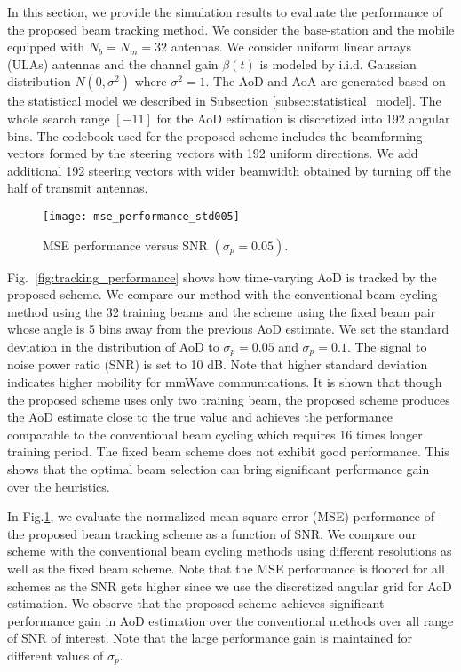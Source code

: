 \documentclass[conference]{IEEEtran}
\begin{document}
In this section, we provide the simulation results to evaluate the performance of the proposed beam tracking method. We consider the base-station and the mobile equipped with $N_{b}=N_{m}=32$ antennas. We consider uniform linear arrays (ULAs) antennas and the channel gain $\beta(t)$ is modeled by i.i.d. Gaussian distribution $N(0,\sigma^{2})$ where $\sigma^{2}=1$. The AoD and AoA are generated based on the statistical model we described in Subsection \ref{subsec:statistical_model}.
The whole search range $[-1 1]$  for the AoD estimation is discretized into 192 angular bins.
The codebook used for the proposed scheme includes the beamforming vectors formed by the steering vectors with 192 uniform directions. We add additional 192 steering vectors with wider beamwidth obtained by turning off the
half of transmit antennas.

\begin{figure} [t]
 \centering
 \texttt{[image: mse\_performance\_std005]}
 \\
 \caption{MSE performance versus SNR $(\sigma_{p}=0.05)$.} \label{fig:mse_performance}
\end{figure}
Fig.~\ref{fig:tracking_performance} shows how time-varying AoD is tracked by the proposed scheme.
We compare our method with the conventional beam cycling method using the 32  training beams
and the  scheme using the fixed beam pair whose angle is 5 bins away from the previous AoD estimate.
We set the standard deviation in the distribution of AoD to $\sigma_{p}=0.05$ and $\sigma_{p}=0.1$. The signal to noise power ratio (SNR) is set to 10 dB. Note that
higher standard deviation indicates higher mobility for mmWave communications.  It is shown that though the proposed scheme uses only two training beam, the proposed scheme produces the AoD estimate close to the true value and achieves the performance comparable to the conventional beam cycling which requires 16 times longer training period.
The fixed beam scheme does not exhibit good performance. This shows that the optimal beam selection can bring significant performance gain over the heuristics.

In Fig.\ref{fig:mse_performance}, we evaluate the normalized mean square error (MSE)  performance of the proposed beam tracking scheme as a function of SNR. We compare our scheme with the conventional beam cycling methods using different resolutions as well as the fixed beam scheme. Note that the MSE performance is floored for all schemes as the SNR gets higher since we use the discretized angular grid for AoD estimation.  We observe that the proposed scheme achieves significant performance gain in  AoD estimation over the conventional methods over all range of SNR of interest. Note that the large performance gain is maintained for different values of $\sigma_{p}$.
\end{document}
